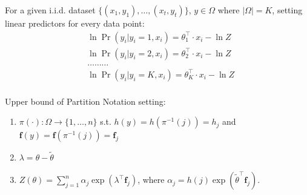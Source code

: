 \documentclass{beamer}
\begin{document}
\begin{frame}{}

For a given i.i.d. dataset $\{(x_1, y_1), \ldots, (x_t, y_t)\}$, $y\in \Omega $ where $|\Omega| = K$, 
setting linear predictors for every data point:
  \begin{equation}
    \begin{aligned}
     &\ln \Pr(y_i | y_i = 1, x_i) = \theta_{1}^{\top } \cdot x_i - \ln Z  \nonumber \\
     &\ln \Pr(y_i | y_i = 2, x_i) = \theta_{2}^{\top } \cdot x_i - \ln Z  \nonumber \\
     &\ldots \ldots \ldots  \\ 
     &\ln \Pr(y_i | y_i = K, x_i) = \theta_{K}^{\top } \cdot x_i - \ln Z  \nonumber \\
    \end{aligned}
   \end{equation}
 \pause {}
  
\end{frame}

\begin{frame}
\begin{block}{Upper bound of Partition}
  Notation setting:
 \begin{enumerate}
  \item $\pi(\cdot): \Omega \to \{1,\ldots,n\} $ s.t. $h(y) = h(\pi^{-1}(j)) = h_j$ and $\textbf{f}(y) = \textbf{f}(\pi^{-1}(j)) = \textbf{f}_j$
  \item $\lambda = \theta - \tilde{\theta}$ 
  \item $Z(\theta) = \sum_{j=1}^{n} \alpha_j \exp(\lambda^{\top}\textbf{f}_j)$, where $\alpha_j = h(j) \exp(\tilde{\theta}^{\top}\textbf{f}_j)$.
 \end{enumerate}
\end{block}
\pause
{}
\end{frame}
\end{document}
